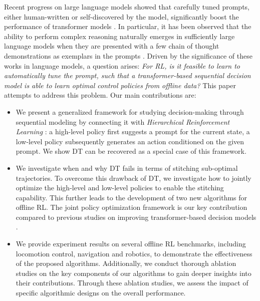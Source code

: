 Recent progress on large language models showed that carefully tuned prompts, either human-written or self-discovered by the model, significantly boost the performance of transformer models  \citep{lester2021power,singhal2022large,zhang2022automatic,wei2022chain,wang2022self,yao2023tree,liu2023chain}. %
In particular, it has been observed that the ability to perform complex reasoning naturally emerges in sufficiently large language models when they are presented with a few chain of thought demonstrations as exemplars in the prompts \citep{wei2022chain,wang2022self,yao2023tree}. 
Driven by the significance of these works in language models, a question arises: 
\emph{For RL, is it feasible to learn to automatically tune the prompt, such that a transformer-based sequential decision model is able to learn optimal control policies from offline data?}
This paper attempts to address this problem. Our main contributions are:

\begin{itemize}[leftmargin=0.5cm]

\item We present a generalized framework for studying decision-making through sequential modeling by connecting it with \emph{Hierarchical Reinforcement Learning} \citep{nachum2018data}: 
a high-level policy first suggests a prompt for the current state, a low-level policy subsequently generates an action conditioned on the given prompt. 
We show DT can be recovered as a special case of this framework. 

\item We investigate when and why DT fails in terms of stitching sub-optimal trajectories. To overcome this drawback of DT, we investigate how to jointly optimize the high-level and low-level policies to enable the stitching capability. This further leads to the development of two new algorithms for offline RL. %
The joint policy optimization framework is our key contribution compared to previous studies on improving transformer-based decision models \citep{yamagata2023q,wu2023elastic,badrinath2023waypoint}. 

\item We provide experiment results on several offline RL benchmarks, including locomotion control, navigation and robotics, to demonstrate the effectiveness of the proposed algorithms. Additionally, we conduct thorough ablation studies on the key components of our algorithms to gain deeper insights into their contributions.   
Through these ablation studies, we assess the impact of specific algorithmic designs on the overall performance.

\end{itemize}

